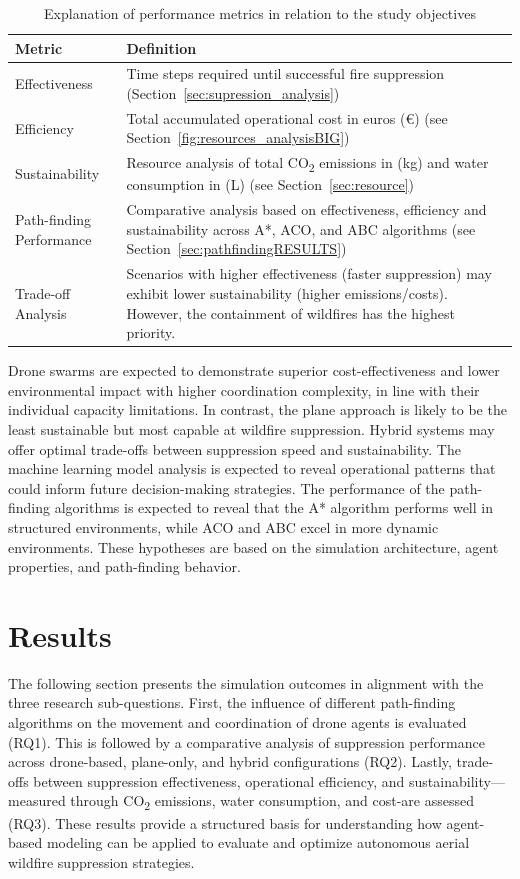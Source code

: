 \documentclass[11pt, a4paper]{article}
\begin{document}
\begin{table}[h!]
\centering
\begin{tabular}{lp{7cm}}
\hline
\textbf{Metric} & \textbf{Definition}\\
\midrule
Effectiveness & Time steps required until successful fire suppression (Section~\ref{sec:supression_analysis})\\
\hline
Efficiency & Total accumulated operational cost in euros (€) (see Section~\ref{fig:resources_analysisBIG}) \\
\hline
Sustainability & Resource analysis of total CO\textsubscript{2} emissions in (kg) and water consumption in (L) (see Section~\ref{sec:resource})  \\
\hline
Path-finding Performance & Comparative analysis based on effectiveness, efficiency and sustainability across A*, ACO, and ABC algorithms (see Section~\ref{sec:pathfindingRESULTS})\\
\hline
Trade-off Analysis & Scenarios with higher effectiveness (faster suppression) may exhibit lower sustainability (higher emissions/costs). However, the containment of wildfires has the highest priority. \\
\hline
\end{tabular}
\caption{Explanation of performance metrics in relation to the study objectives}
\label{tab:performance_metrics}
\end{table}

Drone swarms are expected to demonstrate superior cost-effectiveness and lower environmental impact with higher coordination complexity, in line with their individual capacity limitations. In contrast, the plane approach is likely to be the least sustainable but most capable at wildfire suppression. Hybrid systems may offer optimal trade-offs between suppression speed and sustainability. The machine learning model analysis is expected to reveal operational patterns that could inform future decision-making strategies. The performance of the path-finding algorithms is expected to reveal that the A* algorithm performs well in structured environments, while ACO and ABC excel in more dynamic environments. These hypotheses are based on the simulation architecture, agent properties, and path-finding behavior.

\section{Results}

The following section presents the simulation outcomes in alignment with the three research sub-questions. First, the influence of different path-finding algorithms on the movement and coordination of drone agents is evaluated (RQ1). This is followed by a comparative analysis of suppression performance across drone-based, plane-only, and hybrid configurations (RQ2). Lastly, trade-offs between suppression effectiveness, operational efficiency, and sustainability—measured through CO\textsubscript{2} emissions, water consumption, and cost-are assessed (RQ3). These results provide a structured basis for understanding how agent-based modeling can be applied to evaluate and optimize autonomous aerial wildfire suppression strategies.
\end{document}
